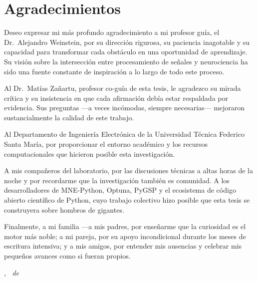 \chapter*{Agradecimientos}

Deseo expresar mi más profundo agradecimiento a mi profesor guía, el Dr.~Alejandro Weinstein, por su dirección rigurosa, su paciencia inagotable y su capacidad para transformar cada obstáculo en una oportunidad de aprendizaje. Su visión sobre la intersección entre procesamiento de señales y neurociencia ha sido una fuente constante de inspiración a lo largo de todo este proceso.

Al Dr.~Matías Zañartu, profesor co-guía de esta tesis, le agradezco su mirada crítica y su insistencia en que cada afirmación debía estar respaldada por evidencia. Sus preguntas —a veces incómodas, siempre necesarias— mejoraron sustancialmente la calidad de este trabajo.

Al Departamento de Ingeniería Electrónica de la Universidad Técnica Federico Santa María, por proporcionar el entorno académico y los recursos computacionales que hicieron posible esta investigación.

A mis compañeros del laboratorio, por las discusiones técnicas a altas horas de la noche y por recordarme que la investigación también es comunidad. A los desarrolladores de MNE-Python, Optuna, PyGSP y el ecosistema de código abierto científico de Python, cuyo trabajo colectivo hizo posible que esta tesis se construyera sobre hombros de gigantes.

Finalmente, a mi familia —a mis padres, por enseñarme que la curiosidad es el motor más noble; a mi pareja, por su apoyo incondicional durante los meses de escritura intensiva; y a mis amigos, por entender mis ausencias y celebrar mis pequeños avances como si fueran propios.

\vspace{2em}
\begin{flushright}
\textit{\ThesisCity, \ThesisMonth\ de \ThesisYear}
\end{flushright}